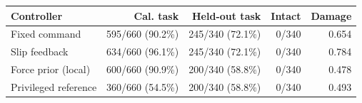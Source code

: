 \begin{tabular}{lrrrr}
\toprule
Controller & Cal. task & Held-out task & Intact & Damage \\
\midrule
Fixed command & 595/660 (90.2\%) & 245/340 (72.1\%) & 0/340 & 0.654 \\
Slip feedback & 634/660 (96.1\%) & 245/340 (72.1\%) & 0/340 & 0.784 \\
Force prior (local) & 600/660 (90.9\%) & 200/340 (58.8\%) & 0/340 & 0.478 \\
\midrule
Privileged reference & 360/660 (54.5\%) & 200/340 (58.8\%) & 0/340 & 0.493 \\
\bottomrule
\end{tabular}
